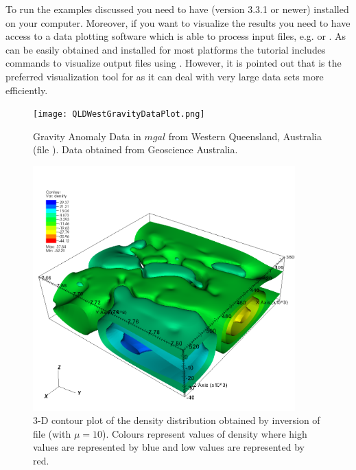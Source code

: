 To run the examples discussed you need to have \escript (version 3.3.1 or
newer) installed on your computer.
Moreover, if you want to visualize the results you need to have access to a
data plotting software which is able to process \VTK input files, e.g.
\mayavi or \VisIt.
As \mayavi can be easily obtained and installed for most platforms the
tutorial includes commands to visualize output files using \mayavi .
However, it is pointed out that \VisIt is the preferred visualization tool for
\escript as it can deal with very large data sets more efficiently.
    
\begin{figure}
\centering
\texttt{[image: QLDWestGravityDataPlot.png]}
\caption{Gravity Anomaly Data in $mgal$ from Western Queensland, Australia
    (file ). Data obtained from Geoscience Australia.}
\label{FIG:P1:GRAV:0}
\end{figure}

\begin{figure}
\centering%
\includegraphics[width=0.9\textwidth]{QLDGravContourMu10.png}
\caption{3-D contour plot of the density distribution obtained by inversion of
    file  (with $\mu=10$).
    Colours represent values of density where high values are represented by
    blue and low values are represented by red.}
\label{FIG:P1:GRAV:1}
\end{figure}

